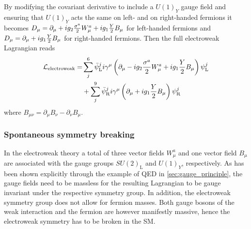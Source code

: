 By modifying the covariant derivative to include a $U(1)_Y$ gauge field and ensuring that $U(1)_Y$ acts the same on left- and on right-handed fermions it becomes $\mathop{}\!D_\mu = \partial_\mu + ig_2\frac{\sigma^a}{2}W^a_\mu + ig_1\frac{Y}{2}B_\mu$ for left-handed fermions and $\mathop{}\!D_\mu = \partial_\mu + ig_1\frac{Y}{2}B_\mu$ for right-handed fermions. Then the full electroweak Lagrangian reads
\begin{equation}
\begin{split}
	\mathcal{L}_\mathrm{electroweak} = & \sum_j^6{\bar{\psi}_\mathrm{L}^j i \gamma^\mu \left(\partial_\mu -ig_2\frac{\sigma^a}{2} W^a_\mu + ig_1 \frac{Y}{2} B_\mu \right) \psi^j_\mathrm{L}} \\
	& + \sum_j^9{\bar{\psi}_\mathrm{R}^j i \gamma^\mu \left(\partial_\mu + ig_1 \frac{Y}{2} B_\mu \right) \psi^j_\mathrm{R}}
\end{split}
\end{equation}
where $B_{\mu\nu} = \partial_\mu B_\nu - \partial_\nu B_\mu$. 

\subsubsection{Spontaneous symmetry breaking}
\label{sec:ssb}



In the electroweak theory a total of three vector fields $W^a_\mu$ and one vector field $B_\mu$ are associated with the gauge groups $SU(2)_\mathrm{L}$ and $U(1)_Y$, respectively. As has been shown explicitly through the example of QED in \cref{sec:gauge_principle}, the gauge fields need to be massless for the resulting Lagrangian to be gauge invariant under the respective symmetry group. In addition, the electroweak symmetry group does not allow for fermion masses. Both gauge bosons of the weak interaction and the fermion are however manifestly massive, hence the electroweak symmetry has to be broken in the SM.

